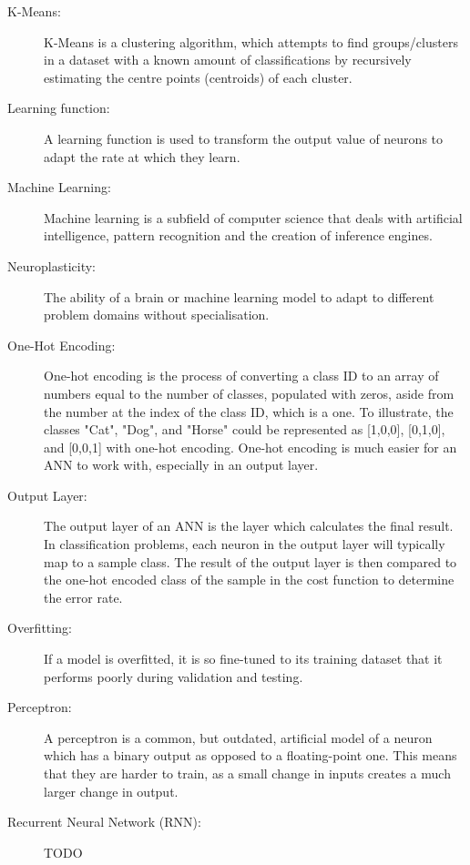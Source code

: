 \documentclass[]{report}
\begin{document}
\begin{description}
\item[K-Means:] K-Means is a clustering algorithm, which attempts to find groups/clusters in a dataset with a known amount of classifications by recursively estimating the centre points (centroids) of each cluster.

\item[Learning function:] A learning function is used to transform the output value of neurons to adapt the rate at which they learn.

\item[Machine Learning:] Machine learning is a subfield of computer science that deals with artificial intelligence, pattern recognition and the creation of inference engines.

\item[Neuroplasticity:] The ability of a brain or machine learning model to adapt to different problem domains without specialisation.

\item[One-Hot Encoding:] One-hot encoding is the process of converting a class ID to an array of numbers equal to the number of classes, populated with zeros, aside from the number at the index of the class ID, which is a one. To illustrate, the classes "Cat", "Dog", and "Horse" could be represented as [1,0,0], [0,1,0], and [0,0,1] with one-hot encoding. One-hot encoding is much easier for an ANN to work with, especially in an output layer.

\item[Output Layer:] The output layer of an ANN is the layer which calculates the final result. In classification problems, each neuron in the output layer will typically map to a sample class. The result of the output layer is then compared to the one-hot encoded class of the sample in the cost function to determine the error rate.

\item[Overfitting:] If a model is overfitted, it is so fine-tuned to its training dataset that it performs poorly during validation and testing.

\item[Perceptron:] A perceptron is a common, but outdated, artificial model of a neuron which has a binary output as opposed to a floating-point one. This means that they are harder to train, as a small change in inputs creates a much larger change in output.

\item[Recurrent Neural Network (RNN):] TODO


\end{description}
\end{document}

